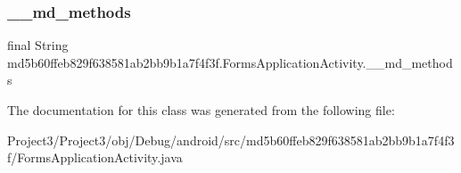 \subsubsection{\texorpdfstring{\+\_\+\+\_\+md\+\_\+methods}{\_\_md\_methods}}
{\footnotesize\ttfamily final String md5b60ffeb829f638581ab2bb9b1a7f4f3f.\+Forms\+Application\+Activity.\+\_\+\+\_\+md\+\_\+methods\hspace{0.3cm}{\ttfamily [static]}}



The documentation for this class was generated from the following file\+:\begin{DoxyCompactItemize}
\item 
Project3/\+Project3/obj/\+Debug/android/src/md5b60ffeb829f638581ab2bb9b1a7f4f3f/Forms\+Application\+Activity.\+java\end{DoxyCompactItemize}
